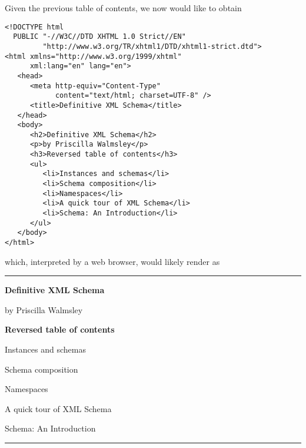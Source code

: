 Given the previous table of contents, we now would like to obtain
\begin{verbatim}
<!DOCTYPE html
  PUBLIC "-//W3C//DTD XHTML 1.0 Strict//EN"  
         "http://www.w3.org/TR/xhtml1/DTD/xhtml1-strict.dtd">
<html xmlns="http://www.w3.org/1999/xhtml"
      xml:lang="en" lang="en">
   <head>
      <meta http-equiv="Content-Type"
            content="text/html; charset=UTF-8" />
      <title>Definitive XML Schema</title>
   </head>
   <body>
      <h2>Definitive XML Schema</h2>
      <p>by Priscilla Walmsley</p>
      <h3>Reversed table of contents</h3>
      <ul>
         <li>Instances and schemas</li>
         <li>Schema composition</li>
         <li>Namespaces</li>
         <li>A quick tour of XML Schema</li>
         <li>Schema: An Introduction</li>
      </ul>
   </body>
</html>
\end{verbatim}
which, interpreted by a web browser, would likely render as

\noindent\rule{\linewidth}{0.5pt}
\noindent\textbf{\large Definitive XML Schema}

\bigskip

\noindent by Priscilla Walmsley

\bigskip

\noindent\textbf{Reversed table of contents}
\begin{itemize*}

  \item Instances and schemas
  \item Schema composition
  \item Namespaces
  \item A quick tour of XML Schema
  \item Schema: An Introduction

\end{itemize*}
\noindent\rule{\linewidth}{0.5pt}

